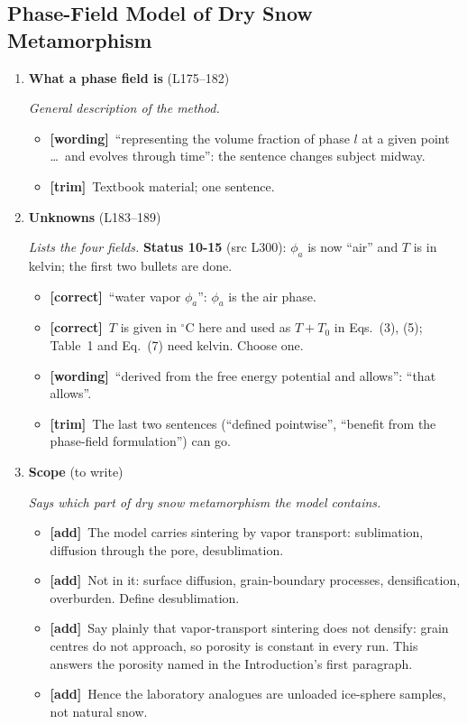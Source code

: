\documentclass[11pt]{article}
\newcommand{\Pg}[3]{\item \textbf{#1} {\small(#2)}\par\textit{#3}}
\newcommand{\tC}{\textcolor{miss}{\textbf{[correct]}}\ }
\newcommand{\tG}{\textcolor{stale}{\textbf{[wording]}}\ }
\newcommand{\tT}{\textcolor{cut}{\textbf{[trim]}}\ }
\newcommand{\tA}{\textcolor{have}{\textbf{[add]}}\ }
\newcommand{\add}[1]{\textcolor{revX}{#1}}
\begin{document}
\subsection{Phase-Field Model of Dry Snow Metamorphism}
\begin{enumerate}
\Pg{What a phase field is}{L175--182}{General description of the method.}
  \begin{itemize}
  \item \tG ``representing the volume fraction of phase $l$ at a given point
    \ldots\ and evolves through time'': the sentence changes subject midway.
  \item \tT Textbook material; one sentence.
  \end{itemize}
\Pg{Unknowns}{L183--189}{Lists the four fields.}
  \add{\textbf{Status 10-15} (src L300): $\phi_a$ is now ``air'' and $T$ is in
  kelvin; the first two bullets are done.}
  \begin{itemize}
  \item \tC ``water vapor $\phi_a$'': $\phi_a$ is the air phase.
  \item \tC $T$ is given in $^{\circ}$C here and used as $T + T_0$ in
    Eqs.~(3), (5); Table~1 and Eq.~(7) need kelvin. Choose one.
  \item \tG ``derived from the free energy potential and allows'': ``that
    allows''.
  \item \tT The last two sentences (``defined pointwise'', ``benefit from the
    phase-field formulation'') can go.
  \end{itemize}
\Pg{Scope}{to write}{Says which part of dry snow metamorphism the model contains.}
  \begin{itemize}
  \item \tA The model carries sintering by vapor transport: sublimation,
    diffusion through the pore, desublimation.
  \item \tA Not in it: surface diffusion, grain-boundary processes,
    densification, overburden. Define desublimation.
  \item \tA Say plainly that vapor-transport sintering does not densify: grain
    centres do not approach, so porosity is constant in every run. This
    answers the porosity named in the Introduction's first paragraph.
  \item \tA Hence the laboratory analogues are unloaded ice-sphere samples,
    not natural snow.
  \end{itemize}

\end{enumerate}
\end{document}

